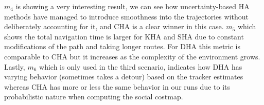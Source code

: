  $m_{4}$ is showing a very interesting result, we can see how uncertainty-based HA methods have managed to introduce smoothness into the trajectories without deliberately accounting for it, and CHA is a clear winner in this case. $m_{5}$ which shows the total navigation time is larger for KHA and SHA due to constant modifications of the path and taking longer routes. For DHA this metric is comparable to CHA but it increases as the complexity of the environment grows. Lastly, $m_{6}$ which is only used in the third scenario, indicates how DHA has varying behavior (sometimes takes a detour) based on the tracker estimates whereas CHA has more or less the same behavior in our runs due to its probabilistic nature when computing the social costmap.     



